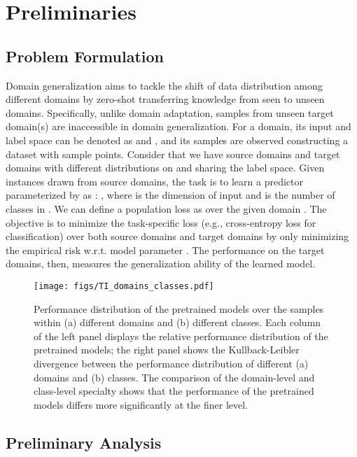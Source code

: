 \documentclass{article}
\begin{document}
\section{Preliminaries}


\subsection{Problem Formulation}
Domain generalization aims to tackle the shift of data distribution among different domains by zero-shot transferring knowledge from seen to unseen domains.
Specifically, unlike domain adaptation, samples from unseen target domain(s) are inaccessible in domain generalization.
For a domain, its input and label space can be denoted as  and , and its samples are observed constructing a dataset  with  sample points. 
Consider that we have  source domains  and  target domains  with different distributions on  and sharing the label space.
Given instances drawn from source domains, the task is to learn a predictor parameterized by  as : , where  is the dimension of input and  is the number of classes in .
We can define a population loss as  over the given domain .
The objective is to minimize the task-specific loss  (e.g., cross-entropy loss 
for classification) over both source domains  and target domains  by only minimizing the empirical risk  w.r.t. model parameter .
The performance on the target domains, then, measures the generalization ability of the learned model.




\begin{figure}[t]
    \begin{center}
    \texttt{[image: figs/TI\_domains\_classes.pdf]}
  \end{center}

  \small
  \caption{
Performance distribution of the pretrained models over the samples within (a) different domains and (b) different classes.
Each column of the left panel displays the relative performance distribution of the pretrained models; the right panel shows the Kullback-Leibler divergence between the performance distribution of different (a) domains and (b) classes.
The comparison of the domain-level and class-level specialty
shows that the performance of the pretrained models differs more significantly at the finer level.
}
  \label{fig:spec different domains}
\end{figure}

\subsection{Preliminary Analysis}
\label{sec:preliminary_analysis}
\end{document}

